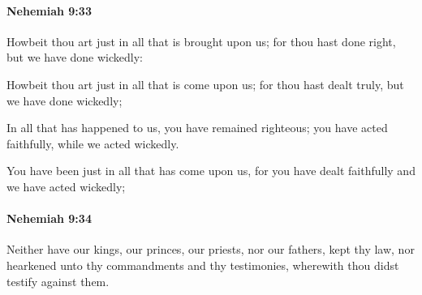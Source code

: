 		\paragraph{Nehemiah 9:33} %
			\label{NEHEMIAH-9-33}

			Howbeit thou art just in all that is brought upon us; for thou hast done right, but we have done wickedly:

			\begin{versebox}
					\item[BHS] 
					\item[LXX] 
					\item[ASV] Howbeit thou art just in all that is come upon us; for thou hast dealt truly, but we have done wickedly;
					\item[NIV] In all that has happened to us, you have remained righteous; you have acted faithfully, while we acted wickedly.
					\item[NRSV] You have been just in all that has come upon us, for you have dealt faithfully and we have acted wickedly;
			\end{versebox}

		\paragraph{Nehemiah 9:34} %
			\label{NEHEMIAH-9-34}

			Neither have our kings, our princes, our priests, nor our fathers, kept thy law, nor hearkened unto thy commandments and thy testimonies, wherewith thou didst testify against them.

